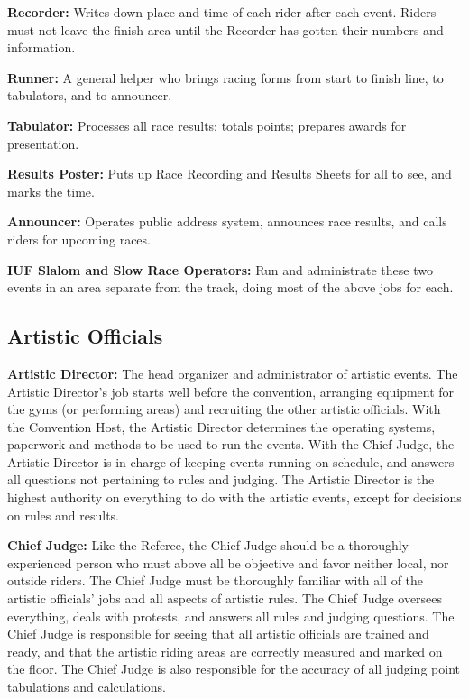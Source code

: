\textbf{Recorder:} Writes down place and time of each rider after each event.
Riders must not leave the finish area until the Recorder has gotten their numbers and information.

\textbf{Runner:} A general helper who brings racing forms from start to finish line, to tabulators, and to announcer.

\textbf{Tabulator:} Processes all race results; totals points; prepares awards for presentation.

\textbf{Results Poster:} Puts up Race Recording and Results Sheets for all to see, and marks the time.

\textbf{Announcer:} Operates public address system, announces race results, and calls riders for upcoming races.

\textbf{IUF Slalom and Slow Race Operators:} Run and administrate these two events in an area separate from the track, doing most of the above jobs for each.

\subsection{Artistic Officials}
\textbf{Artistic Director:} The head organizer and administrator of artistic events.
The Artistic Director's job starts well before the convention, arranging equipment for the gyms (or performing areas) and recruiting the other artistic officials.
With the Convention Host, the Artistic Director determines the operating systems, paperwork and methods to be used to run the events.
With the Chief Judge, the Artistic Director is in charge of keeping events running on schedule, and answers all questions not pertaining to rules and judging.
The Artistic Director is the highest authority on everything to do with the artistic events, except for decisions on rules and results.

\textbf{Chief Judge:} Like the Referee, the Chief Judge should be a thoroughly experienced person who must above all be objective and favor neither local, nor outside riders.
The Chief Judge must be thoroughly familiar with all of the artistic officials' jobs and all aspects of artistic rules.
The Chief Judge oversees everything, deals with protests, and answers all rules and judging questions.
The Chief Judge is responsible for seeing that all artistic officials are trained and ready, and that the artistic riding areas are correctly measured and marked on the floor.
The Chief Judge is also responsible for the accuracy of all judging point tabulations and calculations.

